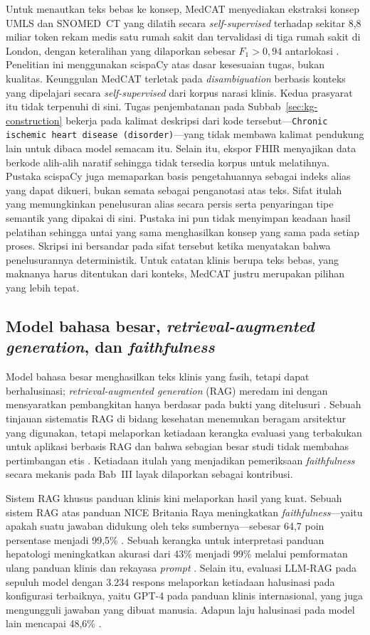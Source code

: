 Untuk menautkan teks bebas ke konsep, MedCAT menyediakan ekstraksi konsep UMLS dan
SNOMED~CT yang dilatih secara \emph{self-supervised} terhadap sekitar 8,8 miliar token rekam
medis satu rumah sakit dan tervalidasi di tiga rumah sakit di London, dengan keteralihan
yang dilaporkan sebesar $F_1 > 0{,}94$ antarlokasi \cite{kraljevic2021}. Penelitian ini
menggunakan scispaCy \cite{scispacy} atas dasar kesesuaian tugas, bukan kualitas. Keunggulan
MedCAT terletak pada \emph{disambiguation} berbasis konteks yang dipelajari secara
\emph{self-supervised} dari korpus narasi klinis. Kedua prasyarat itu tidak terpenuhi di
sini. Tugas penjembatanan pada Subbab~\ref{sec:kg-construction} bekerja pada kalimat
deskripsi dari kode tersebut---\texttt{Chronic ischemic heart disease (disorder)}---yang
tidak membawa kalimat pendukung lain untuk dibaca model semacam itu. Selain itu, ekspor
FHIR menyajikan data berkode alih-alih naratif sehingga tidak tersedia korpus untuk
melatihnya. Pustaka scispaCy juga memaparkan basis pengetahuannya sebagai indeks alias yang dapat
dikueri, bukan semata sebagai penganotasi atas teks. Sifat itulah yang memungkinkan
penelusuran alias secara persis serta penyaringan tipe semantik yang dipakai di sini.
Pustaka ini pun tidak menyimpan keadaan hasil pelatihan sehingga untai yang sama
menghasilkan konsep yang sama pada setiap proses. Skripsi ini bersandar pada sifat tersebut
ketika menyatakan bahwa penelusurannya deterministik. Untuk catatan klinis
berupa teks bebas, yang maknanya harus ditentukan dari konteks, MedCAT justru merupakan pilihan
yang lebih tepat.

\subsection{Model bahasa besar, \emph{retrieval-augmented generation}, dan \emph{faithfulness}}
Model bahasa besar menghasilkan teks klinis yang fasih, tetapi dapat berhalusinasi;
\emph{retrieval-augmented generation} (RAG) meredam ini dengan mensyaratkan pembangkitan hanya berdasar pada
bukti yang ditelusuri \cite{rag_lewis2020}. Sebuah tinjauan sistematis RAG di bidang kesehatan
menemukan beragam arsitektur yang digunakan, tetapi melaporkan ketiadaan
kerangka evaluasi yang terbakukan untuk aplikasi berbasis RAG dan bahwa sebagian besar studi
tidak membahas pertimbangan etis \cite{amugongo2025}. Ketiadaan itulah yang
menjadikan pemeriksaan \emph{faithfulness} secara mekanis pada Bab~III layak dilaporkan
sebagai kontribusi.

Sistem RAG khusus panduan klinis kini melaporkan hasil yang kuat. Sebuah sistem RAG atas panduan NICE
Britania Raya meningkatkan \emph{faithfulness}---yaitu apakah suatu jawaban
didukung oleh teks sumbernya---sebesar 64,7 poin persentase menjadi
99,5\% \cite{lewis2025}. Sebuah kerangka untuk interpretasi
panduan hepatologi meningkatkan akurasi dari 43\% menjadi 99\% melalui
pemformatan ulang panduan klinis dan rekayasa \emph{prompt} \cite{kresevic2024}. Selain itu,
evaluasi LLM-RAG pada sepuluh model dengan 3.234 respons melaporkan ketiadaan
halusinasi pada konfigurasi terbaiknya, yaitu GPT-4 pada panduan klinis internasional, yang
juga mengungguli jawaban yang dibuat manusia. Adapun laju halusinasi pada model lain
mencapai 48,6\% \cite{ke2025}.


